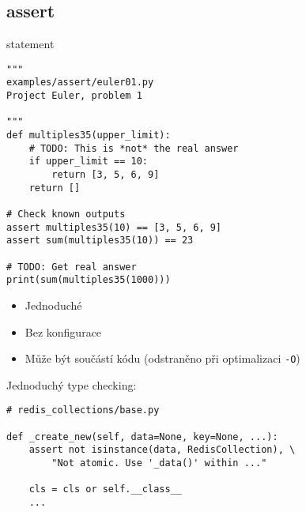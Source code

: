 \subsection{assert}

\begin{frame}
\begin{center}
\huge{ statement}
\end{center}
\end{frame}

\begin{frame}[fragile]
\begin{verbatim}
"""
examples/assert/euler01.py
Project Euler, problem 1

"""
def multiples35(upper_limit):
    # TODO: This is *not* the real answer
    if upper_limit == 10:
        return [3, 5, 6, 9]
    return []

# Check known outputs
assert multiples35(10) == [3, 5, 6, 9]
assert sum(multiples35(10)) == 23

# TODO: Get real answer
print(sum(multiples35(1000)))
\end{verbatim}
\end{frame}

\begin{frame}
\begin{itemize}[<+->]
\item Jednoduché
\item Bez konfigurace
\item Může být součástí kódu (odstraněno při optimalizaci {\tt -O})
\end{itemize}
\end{frame}

\begin{frame}[fragile]
Jednoduchý type checking:
\begin{verbatim}
# redis_collections/base.py

def _create_new(self, data=None, key=None, ...):
    assert not isinstance(data, RedisCollection), \
        "Not atomic. Use '_data()' within ..."

    cls = cls or self.__class__
    ...
\end{verbatim}
\end{frame}

